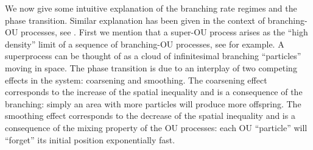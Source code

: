 \documentclass[12pt,a4paper]{amsart}
\theoremstyle{plain}
\theoremstyle{definition}
\numberwithin{equation}{section}
\begin{document}
 We now give some intuitive explanation of the branching rate regimes and the  phase transition.
Similar explanation has been given in the context of branching-OU processes, see \cite{MarksMilos2018CLT}.
First we mention that a super-OU process arises as the ``high density'' limit of a sequence of branching-OU processes, see \cite{Li2011Measure-valued} for example. A superprocess can be thought of as a cloud of infinitesimal branching ``particles'' moving in space.
The phase transition is due to an interplay of two competing effects in the system: coarsening and smoothing.
The coarsening effect corresponds to the increase of the spatial inequality and is a consequence of the branching: simply an area with more particles will produce more offspring.
The smoothing effect corresponds to the decrease of the spatial inequality and is a consequence of the mixing property of the OU processes: each OU ``particle'' will ``forget'' its initial position exponentially fast.
\end{document}

